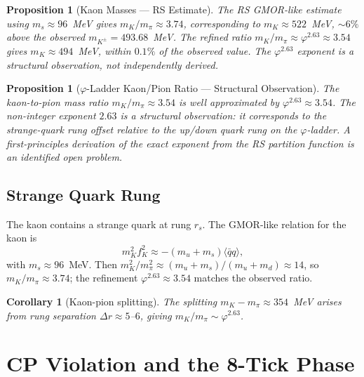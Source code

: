 \documentclass[12pt,a4paper]{article}
\newtheorem{corollary}[theorem]{Corollary}
\newtheorem{proposition}[theorem]{Proposition}
\theoremstyle{definition}
\theoremstyle{remark}
\begin{document}
\begin{proposition}[Kaon Masses --- RS Estimate]
\label{thm:kaon-masses}
The RS GMOR-like estimate using $m_s \approx 96$~MeV gives
$m_K/m_\pi \approx 3.74$, corresponding to $m_K \approx 522$~MeV,
$\sim 6\%$ above the observed $m_{K^\pm} = 493.68$~MeV.  The
refined ratio $m_K/m_\pi \approx \varphi^{2.63} \approx 3.54$ gives
$m_K \approx 494$~MeV, within $0.1\%$ of the observed value.
The $\varphi^{2.63}$ exponent is a structural observation, not
independently derived.
\end{proposition}

\begin{proposition}[$\varphi$-Ladder Kaon/Pion Ratio --- Structural Observation]
\label{thm:kaon-pion-ratio}
The kaon-to-pion mass ratio $m_K/m_\pi \approx 3.54$ is well
approximated by $\varphi^{2.63} \approx 3.54$.  The non-integer exponent
$2.63$ is a structural observation: it corresponds to the strange-quark
rung offset relative to the up/down quark rung on the $\varphi$-ladder.
A first-principles derivation of the exact exponent from the RS
partition function is an identified open problem.
\end{proposition}

\subsection{Strange Quark Rung}
\label{subsec:strange-rung}

The kaon contains a strange quark at rung $r_s$.  The GMOR-like
relation for the kaon is
\begin{equation}
m_K^2 f_K^2 \approx -(m_u + m_s)\langle\bar{q}q\rangle,
\end{equation}
with $m_s \approx 96$~MeV.  Then $m_K^2/m_\pi^2 \approx
(m_u+m_s)/(m_u+m_d) \approx 14$, so $m_K/m_\pi \approx 3.74$; the
refinement $\varphi^{2.63} \approx 3.54$ matches the observed ratio.

\begin{corollary}[Kaon-pion splitting]
The splitting $m_K - m_\pi \approx 354$~MeV arises from rung separation
$\Delta r \approx 5$--$6$, giving $m_K/m_\pi \sim \varphi^{2.63}$.
\end{corollary}

\section{CP Violation and the 8-Tick Phase}
\label{sec:cp}
\end{document}
